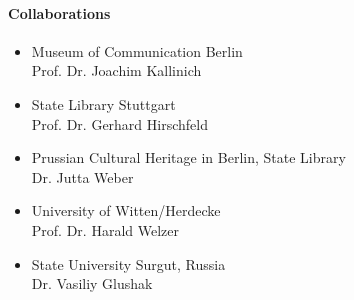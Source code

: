 \paragraph{Collaborations}
\begin{itemize}
\item Museum of Communication Berlin \\ Prof. Dr. Joachim Kallinich
\item State Library Stuttgart \\ Prof. Dr. Gerhard Hirschfeld
\item Prussian Cultural Heritage in Berlin, State Library \\ Dr. Jutta Weber 
\item University of Witten/Herdecke \\ Prof. Dr. Harald Welzer
\item State University Surgut, Russia \\ Dr. Vasiliy Glushak
\end{itemize}

\begin{bibunit}[apalike]
\nocite{*}
\putbib[profClemensSchwender3]
\end{bibunit}
